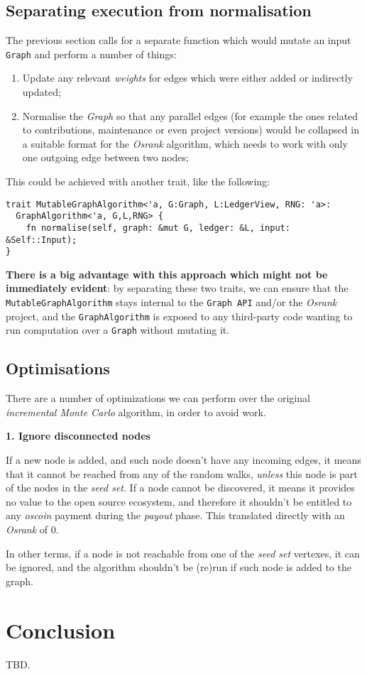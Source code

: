 \documentclass{article}
\begin{document}
\subsection{Separating execution from normalisation}

The previous section calls for a separate function which would
mutate an input \texttt{Graph} and perform a number of things:

\begin{enumerate}
\item Update any relevant \textit{weights} for edges which
      were either added or indirectly updated;
\item Normalise the \textit{Graph} so that any parallel
      edges (for example the ones related to contributions,
      maintenance or even project versions) would be collapsed
      in a suitable format for the \textit{Osrank} algorithm,
      which needs to work with only one outgoing edge between
      two nodes;
\end{enumerate}

This could be achieved with another trait, like the following:

\begin{verbatim}
trait MutableGraphAlgorithm<'a, G:Graph, L:LedgerView, RNG: 'a>:
  GraphAlgorithm<'a, G,L,RNG> {
    fn normalise(self, graph: &mut G, ledger: &L, input: &Self::Input);
}
\end{verbatim}

\textbf{There is a big advantage with this approach which might not be
immediately evident}: by separating these two traits, we can ensure
that the \texttt{MutableGraphAlgorithm} stays internal to the
\texttt{Graph API} and/or the \textit{Osrank} project, and the
\texttt{GraphAlgorithm} is exposed to any third-party code wanting
to run computation over a \texttt{Graph} without mutating it.

\subsection{Optimisations}

There are a number of optimizations we can perform over the
original \textit{incremental Monte Carlo} algorithm, in order to
avoid work.

\textbf{1. Ignore disconnected nodes}

If a new node is added, and such node doesn't have any incoming
edges, it means that it cannot be reached from any of the random
walks, \textit{unless} this node is part of the nodes in the
\textit{seed set}. If a node cannot be discovered, it means it
provides no value to the open source ecosystem, and therefore it
shouldn't be entitled to any \textit{oscoin} payment during the
\textit{payout} phase. This translated directly with an
\textit{Osrank} of $0$.

In other terms, if a node is not reachable from one of the
\textit{seed set} vertexes, it can be ignored, and the algorithm
shouldn't be (re)run if such node is added to the graph.

\section{Conclusion}

TBD.



\end{document}
